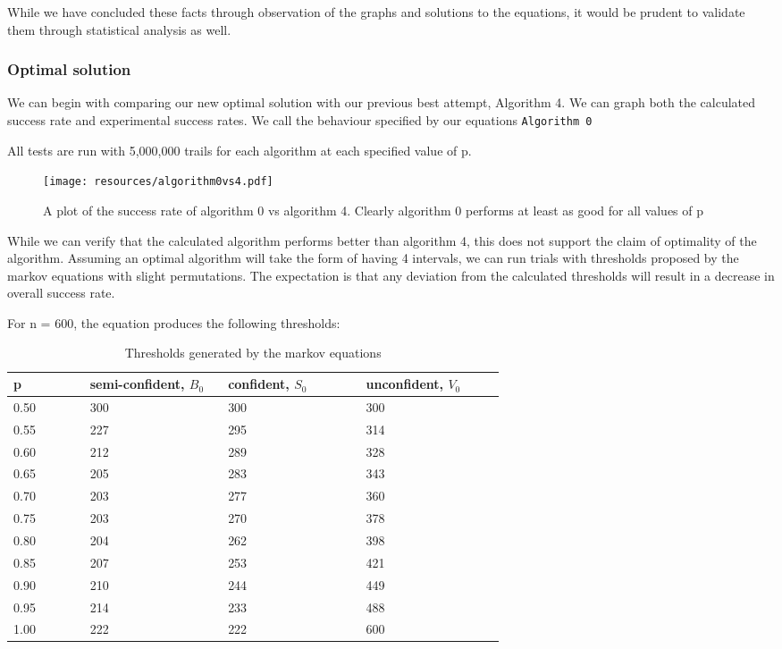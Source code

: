 \documentclass[a4paper,11pt]{article}
\begin{document}
While we have concluded these facts through observation of the graphs and solutions to the equations, it would be prudent to validate them through statistical analysis as well.

\subsubsection{Optimal solution}

We can begin with comparing our new optimal solution with our previous best attempt, Algorithm 4. We can graph both the calculated success rate and experimental success rates. We call the behaviour specified by our equations \verb|Algorithm 0|

All tests are run with 5,000,000 trails for each algorithm at each specified value of p. 

\begin{figure}[H]
    \centering
    \texttt{[image: resources/algorithm0vs4.pdf]}
    \caption{A plot of the success rate of algorithm 0 vs algorithm 4. Clearly algorithm 0 performs at least as good for all values of p}
    \label{fig:plots of algorithm 0 vs 4}
\end{figure}

While we can verify that the calculated algorithm performs better than algorithm 4, this does not support the claim of optimality of the algorithm. Assuming an optimal algorithm will take the form of having 4 intervals, we can run trials with thresholds proposed by the markov equations with slight permutations. The expectation is that any deviation from the calculated thresholds will result in a decrease in overall success rate.

For n = 600, the equation produces the following thresholds:

\begin{table}[H]
\begin{center}
\begin{tabular}{|p{0.10\linewidth}|p{0.18\linewidth}|p{0.18\linewidth}|p{0.18\linewidth}|}

\hline
p & semi-confident, $B_0$&confident, $S_0$& unconfident, $V_0$\\
\hline
0.50 & 300 & 300 & 300 \\
\hline
0.55 &227 & 295 & 314 \\
\hline
0.60 &212& 289 & 328\\
\hline
0.65 &205& 283 &  343\\
\hline
0.70 &203& 277 &  360\\
\hline
0.75 & 203 & 270 &  378\\
\hline
0.80 &204& 262 &  398\\
\hline
0.85 &207& 253 &  421\\
\hline
0.90 &210& 244 &  449\\
\hline
0.95 &214& 233 &  488\\
\hline
1.00 &222& 222 &  600\\
\hline

\end{tabular}
\caption{Thresholds generated by the markov equations}
\end{center}
\end{table}
\end{document}
